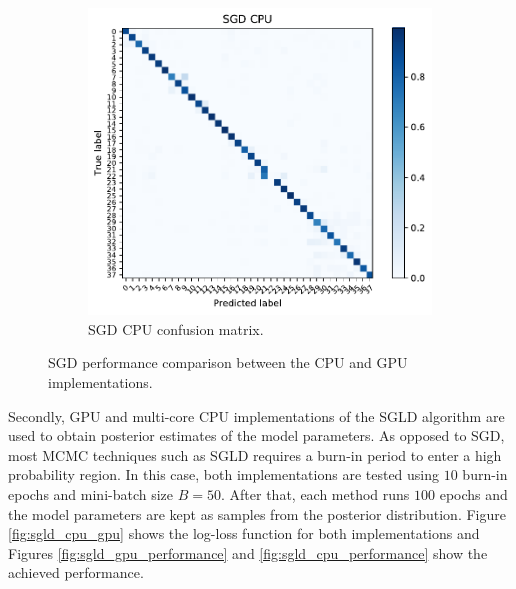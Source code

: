 \documentclass[conference]{IEEEtran}
\begin{document}
\begin{figure}
\begin{subfigure}[b]{0.5\textwidth}
		\includegraphics[width=\textwidth]{results/plants_confusion_matrix_sgd_cpu}
		\caption{SGD CPU confusion matrix.}
		\label{fig:sgd_cpu_performance}
	\end{subfigure}
	\caption{SGD performance comparison between the CPU and GPU implementations.}
\end{figure}

Secondly, GPU and multi-core CPU implementations of the SGLD algorithm are used to obtain posterior estimates of the model parameters. As opposed to SGD, most MCMC techniques such as SGLD requires a burn-in period to enter a high probability region. In this case, both implementations are tested using $10$ burn-in epochs and mini-batch size $B=50$. After that, each method runs $100$ epochs and the model parameters are kept as samples from the posterior distribution. Figure \ref{fig:sgld_cpu_gpu} shows the log-loss function for both implementations and Figures \ref{fig:sgld_gpu_performance} and \ref{fig:sgld_cpu_performance} show the achieved performance.
\end{document}
